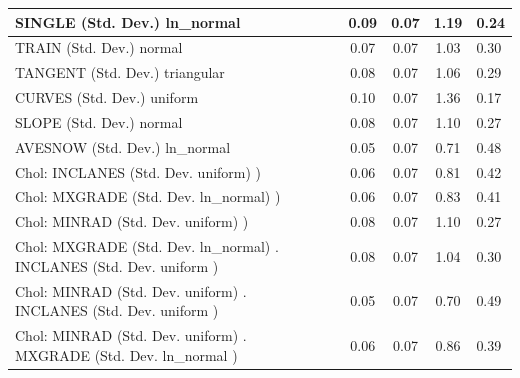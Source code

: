 \begin{table}
\begin{center}
\begin{tabular}{|l|l|c|c|c|l|}
			\hline
			SINGLE (Std. Dev.) ln_normal &  & 0.09 & 0.07 & 1.19 & 0.24 \\
			\hline
			TRAIN (Std. Dev.) normal &  & 0.07 & 0.07 & 1.03 & 0.30 \\
			\hline
			TANGENT (Std. Dev.) triangular &  & 0.08 & 0.07 & 1.06 & 0.29 \\
			\hline
			CURVES (Std. Dev.) uniform &  & 0.10 & 0.07 & 1.36 & 0.17 \\
			\hline
			SLOPE (Std. Dev.) normal &  & 0.08 & 0.07 & 1.10 & 0.27 \\
			\hline
			AVESNOW (Std. Dev.) ln_normal &  & 0.05 & 0.07 & 0.71 & 0.48 \\
			\hline
			 Chol: INCLANES (Std. Dev. uniform) ) &  & 0.06 & 0.07 & 0.81 & 0.42 \\
			\hline
			 Chol: MXGRADE (Std. Dev. ln_normal) ) &  & 0.06 & 0.07 & 0.83 & 0.41 \\
			\hline
			 Chol: MINRAD (Std. Dev. uniform) ) &  & 0.08 & 0.07 & 1.10 & 0.27 \\
			\hline
			 Chol: MXGRADE (Std. Dev. ln_normal) . INCLANES (Std. Dev.   uniform ) &  & 0.08 & 0.07 & 1.04 & 0.30 \\
			\hline
			 Chol: MINRAD (Std. Dev. uniform) . INCLANES (Std. Dev.   uniform ) &  & 0.05 & 0.07 & 0.70 & 0.49 \\
			\hline
			 Chol: MINRAD (Std. Dev. uniform) . MXGRADE (Std. Dev.   ln_normal ) &  & 0.06 & 0.07 & 0.86 & 0.39 \\
			\hline
		\end{tabular}
	\end{center}
\end{table}